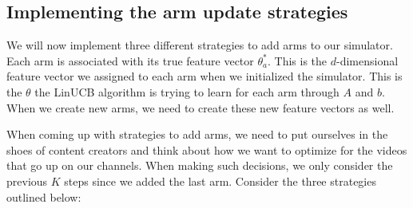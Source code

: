 \subsection*{Implementing the arm update strategies}

We will now implement three different strategies to add arms to our simulator. Each arm is associated with its true feature vector $\theta^*_a$. This is the $d$-dimensional feature vector we assigned to each arm when we initialized the simulator. This is the $\theta$ the LinUCB algorithm is trying to learn for each arm through $A$ and $b$. When we create new arms, we need to create these new feature vectors as well.

\noindent
When coming up with strategies to add arms, we need to put ourselves in the shoes of content creators and think about how we want to optimize for the videos that go up on our channels. When making such decisions, we only consider the previous $K$ steps since we added the last arm. Consider the three strategies outlined below:


